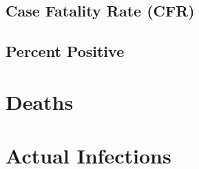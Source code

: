\documentclass[
]{book}
\begin{document}
\hypertarget{case-fatality-rate-cfr}{%
\section{Case Fatality Rate (CFR)}\label{case-fatality-rate-cfr}}

\hypertarget{percent-positive}{%
\section{Percent Positive}\label{percent-positive}}

\hypertarget{deaths}{%
\chapter{Deaths}\label{deaths}}

\hypertarget{actual-infections}{%
\chapter{Actual Infections}\label{actual-infections}}
\end{document}

